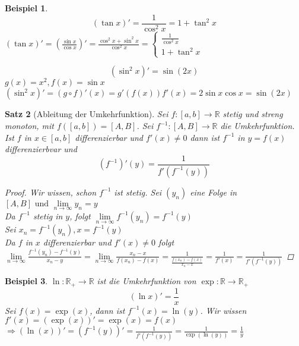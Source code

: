 \documentclass[a4paper,titlepage,oneside]{article}
\def\R{\ensuremath{\mathbb{R}} }
\def\im{\ensuremath{\mathit{i}} }
\def\e{\ensuremath{\mathit{e}} }
\renewcommand{\liminf}[2][n]{\ensuremath{\lim\limits_{#1 \rightarrow \infty}{#2}}}
\theoremstyle{thmstyle}
\newtheorem{satz}{Satz}[subsection]
\newtheorem{bsp}[satz]{Beispiel}
\begin{document}
\begin{bsp}
\item \[ (\tan x)' = \frac{1}{\cos^2  x} = 1 + \tan^2 x\]
$(\tan x)' = \left( \frac{\sin x}{\cos x} \right)' = \frac{\cos^2 x + \sin^2 x}{\cos^2 x} =\begin{cases} \frac{1}{\cos^2  x} \\ 1 + \tan^2 x \end{cases}$
\item \[(\sin^2 x)' = \sin (2x)\]
$g(x) = x^2, f(x) = \sin x$ \\
$(\sin^2 x)' = (g \circ f)'(x) = g'(f(x))f'(x) = 2 \sin x \cos x = \sin (2x)$
\end{bsp}

\begin{satz}[Ableitung der Umkehrfunktion]
Sei $f : [a,b] \to \R $ stetig und streng monoton, mit $f([a,b]) = [A,B]$. Sei $f^{-1} : [A,B] \to \R$ die Umkehrfunktion.
Ist $f$ in $x \in [a,b]$ differenzierbar und $f'(x) \ne 0$ dann ist $f^{-1}$ in $y = f(x)$ differenzierbvar und \[(f^{-1})' (y) = \frac{1}{f'(f^{-1}(y))}\]
\begin{proof}
Wir wissen, schon $f^{-1}$ ist stetig. Sei $(y_n)$ eine Folge in $[A, B] \text{ und } \liminf{y_n} = y$\\
Da $f^{-1}$ stetig in $y$, folgt $\liminf{f^{-1}(y_n)} = f^{-1}(y)$\\
Sei $x_n = f^{-1}(y_n), x= f^{-1}(y)$\\
Da $f$ in $x$ differenzierbar und $f'(x) \ne 0$ folgt $\liminf{\frac{f^{-1}(y_n) - f^{-1}(y)}{x_n - y}} = \liminf{\frac{x_n - x}{f(x_n)-f(x)}} = \frac{1}{\frac{f(x_n) - f(x)}{x_n - x}} = \frac{1}{f'(x)} = \frac{1}{f'(f^{-1}(y))}$
\end{proof}
\end{satz}

\begin{bsp}
$\ln : \R_+ \to \R$ ist die Umkehrfunktion von $\exp: \R \to \R_+$
\[(\ln x)' = \frac{1}{x}\]
Sei $f(x) = \exp(x)$, dann ist $f^{-1}(x) = \ln(y)$. Wir wissen $f'(x) = (\exp(x))' = \exp(x) = f(x)$
$\Rightarrow (\ln(x))' = (f^{-1}(y))' = \frac{1}{f'(f^{-1}(y))} = \frac{1}{\exp(\ln(y))} = \frac{1}{y}$
\end{bsp}
\end{document}
